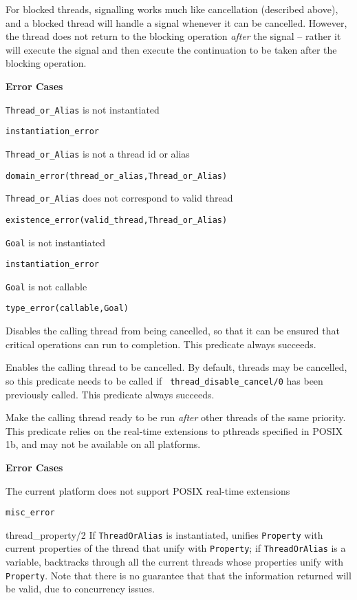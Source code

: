 \begin{description}
For blocked threads, signalling works much like cancellation
(described above), and a blocked thread will handle a signal whenever
it can be cancelled.  However, the thread does not return to the
blocking operation {\em after} the signal -- rather it will execute
the signal and then execute the continuation to be taken after the
blocking operation.

{\bf Error Cases}
\bi
\item 	{\tt Thread\_or\_Alias} is not instantiated
\bi
\item 	{\tt instantiation\_error}
\ei
%
\item 	{\tt Thread\_or\_Alias} is not a thread id or alias
\bi
\item 	{\tt domain\_error(thread\_or\_alias,Thread\_or\_Alias)}
\ei
%
\item   {\tt Thread\_or\_Alias} does not correspond to valid thread
\bi
\item   {\tt existence\_error(valid\_thread,Thread\_or\_Alias)}
\ei
\item   {\tt Goal} is not instantiated
\bi
\item 	{\tt instantiation\_error}
\ei
\item   {\tt Goal} is not callable
\bi
\item 	{\tt type\_error(callable,Goal)}
\ei
\ei

% 
Disables the calling thread from being cancelled, so that it can be
ensured that critical operations can run to completion.  This
predicate always succeeds.

% 
Enables the calling thread to be cancelled.  By default, threads may
be cancelled, so this predicate needs to be called if {\tt
  thread\_disable\_cancel/0} has been previously called.  This
predicate always succeeds.

% 
Make the calling thread ready to be run {\em after} other threads of
the same priority.  This predicate relies on the real-time extensions
to pthreads specified in POSIX 1b, and may not be available on all
platforms.

{\bf Error Cases}
\bi
\item 	The current platform does not support POSIX real-time extensions
\bi
\item 	{\tt misc\_error}
\ei
\ei

{thread\_property/2}
%
If {\tt ThreadOrAlias} is instantiated, unifies {\tt Property} with
current properties of the thread that unify with {\tt Property}; if
{\tt ThreadOrAlias} is a variable, backtracks through all the current
threads whose properties unify with {\tt Property}.  Note that there
is no guarantee that that the information returned will be valid, due
to concurrency issues.


\end{description}
